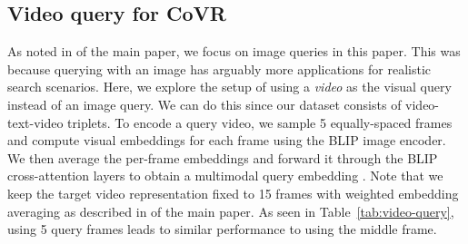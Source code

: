  

\subsection{Video query for CoVR}
\label{app:subsec:video-query}
As noted in
\if{} \fi
of the main paper,
we focus on image queries in this paper. This was because querying with an image
has arguably more applications for realistic search scenarios.
Here, we explore the setup of using a \textit{video} as the visual query instead of an image query.
We can do this since our dataset consists of video-text-video triplets.
To encode a query video, we sample 5 equally-spaced frames and compute visual
embeddings for each frame using the BLIP image encoder.
We then average the per-frame
embeddings and forward it through the BLIP cross-attention layers to obtain a multimodal query embedding .
Note that we keep the target video representation fixed to 15 frames with weighted embedding averaging
as described in
\if{} \fi
of the main paper.
As seen in Table~\ref{tab:video-query}, using 5 query frames leads to
similar performance to using the middle frame.

\begin{table}
    \caption{\textbf{Querying with a video:}
        We report results on \ourDSm by using multiple frames from the query {\em video}.
        Recall that the rest of the paper investigates the setup where the middle video frame is used as an {\em image} query.
        To keep the computational complexity low, we only use 5 query video frames (uniformly sampled
        throughout the video). The number of target video frames remains unchanged as 15.
        The performance is similar to the image query setup, with marginal increase.
    }
    \label{tab:video-query} \centering
\end{table} 

